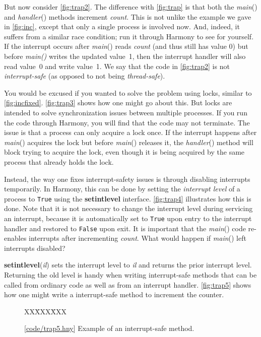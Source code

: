 \documentclass{report}
\newcommand{\harmonysource}[1]{
\begin{tabbing}
XX\=XXX\=XXX\kill
    
\end{tabbing}
}
\newcommand{\harmonylink}[1]{%
[\href{https://www.cs.cornell.edu/home/rvr/harmony/#1}{\underline{#1}}]%
}
\newenvironment{code}{
\tcolorbox
}{
\endtcolorbox
}
\begin{document}
But now consider \autoref{fig:trap2}.  The difference with \autoref{fig:trap} is
that both the \textit{main}() and \textit{handler}() methods increment \textit{count}.
This is not unlike the example we gave in \autoref{fig:inc}, except that only a single
process is involved now.  And, indeed, it suffers from a similar race condition; run
it through Harmony to see for yourself.  If the interrupt occurs after \textit{main}()
reads \textit{count} (and thus still has value 0) but before \textit{main()} writes the
updated value~1, then the interrupt handler will also read value~0 and write value~1.
We say that the code in \autoref{fig:trap2} is not \textit{interrupt-safe} (as opposed
to not being \textit{thread-safe}).

You would be excused if you wanted to solve the problem using locks, similar to
\autoref{fig:incfixed}.  \autoref{fig:trap3} shows how one might go about this.
But locks are intended to solve synchronization issues between multiple processes.
If you run the code through Harmony, you will find that the code may not terminate.
The issue is that a process can only acquire a lock once.  If the interrupt happens
after \textit{main}() acquires the lock but before \textit{main}() releases it, the
\textit{handler}() method will block trying to acquire the lock, even though
it is being acquired by the same process that already holds the lock.

Instead, the way one fixes interrupt-safety issues is through disabling interrupts
temporarily.  In Harmony, this can be done by setting the \textit{interrupt level}
of a process to \texttt{True} using the \textbf{setintlevel} interface.
\autoref{fig:trap4} illustrates how this is done.
Note that it is not necessary to change the interrupt level during servicing an
interrupt, because it is automatically set to \texttt{True} upon entry to the interrupt
handler and restored to \texttt{False} upon exit.
It is important that the \textit{main}() code re-enables interrupts after incrementing
\textit{count}.  What would happen if \textit{main}() left interrupts disabled?

\textbf{setintlevel}(\textit{il}) sets the interrupt level to \textit{il} and returns
the prior interrupt level.  Returning the old level is handy when writing interrupt-safe
methods that can be called from ordinary code as well as from an interrupt handler.
\autoref{fig:trap5} shows how one might write a interrupt-safe method
to increment the counter.

\begin{figure}
\begin{code}
\harmonysource{trap5}
\end{code}
\caption{\harmonylink{code/trap5.hny} Example of an interrupt-safe method.}
\label{fig:trap5}
\end{figure}
\end{document}
